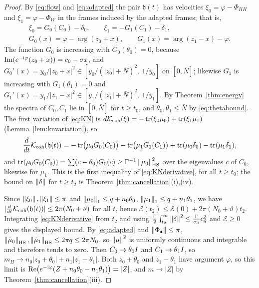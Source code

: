 \begin{proof}
By \eqref{eq:flow} and \eqref{eq:adapted} the pair $\mathfrak h(t)$ has velocities
$\xi_0=\varphi-\Phi_{HH}$ and $\xi_1=\varphi-\Phi_W$ in the frames induced by
the adapted frames; that is,
\begin{equation}\label{eq:velocities}
 \begin{gathered}
 \xi_0=G_0(C_0)-\delta_0,\qquad\xi_1=-G_1(C_1)-\delta_1,\\
 G_0(x)=\varphi-\arg(z_0+x),\qquad G_1(x)=\arg(z_1-x)-\varphi .
 \end{gathered}
\end{equation}
The function $G_0$ is increasing with $G_0(\theta_0)=0$, because
$\operatorname{Im}(e^{-\mathrm i\varphi}(z_0+x))=c_0-\sigma x$, and
$G_0'(x)=y_0/|z_0+x|^2\in[y_0/(|z_0|+\bar N)^2,\ 1/y_0]$ on $[0,\bar N]$;
likewise $G_1$ is increasing with $G_1(\theta_1)=0$ and
$G_1'(x)=y_1/|z_1-x|^2\in[y_1/(|z_1|+\bar N)^2,\ 1/y_1]$. By
Theorem~\ref{thm:energy} the spectra of $C_0,C_1$ lie in $[0,\bar N]$ for
$t\geq t_0$, and $\theta_0,\theta_1\leq\bar N$ by \eqref{eq:thetabound}. The first variation of \eqref{eq:KN} is
$d\mathcal K_{\mathrm{coh}}(\xi)=-\operatorname{tr}(\xi_0\mu_0)+\operatorname{tr}(\xi_1\mu_1)$
(Lemma~\ref{lem:knvariation}), so
\[
 \frac d{dt}\mathcal K_{\mathrm{coh}}(\mathfrak h(t))
 =-\operatorname{tr}\bigl(\mu_0G_0(C_0)\bigr)-\operatorname{tr}\bigl(\mu_1G_1(C_1)\bigr)
 +\operatorname{tr}(\mu_0\delta_0)-\operatorname{tr}(\mu_1\delta_1),
\]
and $\operatorname{tr}(\mu_0G_0(C_0))=\sum(c-\theta_0)G_0(c)\geq\Gamma^{-1}\left\lVert\mu_0\right\rVert_{\mathrm{HS}}^2$
over the eigenvalues $c$ of $C_0$, likewise for $\mu_1$. This is the first
inequality of \eqref{eq:KNderivative}, for all $t\geq t_0$; the bound on
$\left\lVert\delta\right\rVert$ for $t\geq t_2$ is Theorem~\ref{thm:cancellation}(i),(iv).

Since $\left\lVert\xi_0\right\rVert,\left\lVert\xi_1\right\rVert\leq\pi$ and
$\left\lVert\mu_0\right\rVert_1\leq q+n_0\theta_0$, $\left\lVert\mu_1\right\rVert_1\leq q+n_1\theta_1$, we have
$|\frac d{dt}\mathcal K_{\mathrm{coh}}(\mathfrak h(t))|\leq2\pi(N_0+\vartheta)$ for all $t$, hence
$\mathcal E(t_2)\leq\mathcal E(0)+2\pi(N_0+\vartheta)t_2$. Integrating
\eqref{eq:KNderivative} from $t_2$ and using
$\frac\Gamma2\int_{t_2}^\infty\left\lVert\delta\right\rVert^2\leq\frac\Gamma{\alpha_1}c_\delta^2$
and $\mathcal E\geq0$ gives the displayed bound. By \eqref{eq:adapted} and
$\left\lVert\Phi_\bullet\right\rVert\leq\pi$,
$\left\lVert\dot\mu_0\right\rVert_{\mathrm{HS}},\left\lVert\dot\mu_1\right\rVert_{\mathrm{HS}}\leq2\pi q\leq2\pi N_0$, so
$\left\lVert\mu\right\rVert^2$ is uniformly continuous and integrable and therefore tends to
zero. Then $C_0\to\theta_0I$ and $C_1\to\theta_1I$, so
$m_H\to n_0|z_0+\theta_0|+n_1|z_1-\theta_1|$. Both $z_0+\theta_0$ and
$z_1-\theta_1$ have argument $\varphi$, so this limit is
$\operatorname{Re}\bigl(e^{-\mathrm i\varphi}(Z+n_0\theta_0-n_1\theta_1)\bigr)=|Z|$, and
$m\to|Z|$ by Theorem~\ref{thm:cancellation}(iii).


\end{proof}
